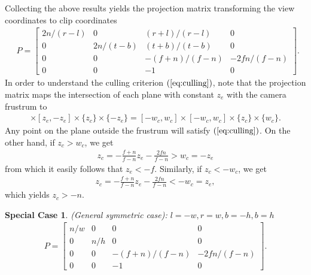 \documentclass [12pt, a4paper] {article}
\newtheorem {specialcase} {Special Case}
\begin{document}
Collecting the above results yields the projection matrix transforming the view 
coordinates to clip coordinates
\begin {eqnarray}
    \boxed {
        \quad
        P
        =
        \begin {bmatrix}
            2n/(r-l) & 0 & (r+l)/(r-l) & 0 \\
            0 & 2n/(t-b) & (t+b)/(t-b) & 0 \\
            0 & 0 & -(f+n)/(f-n) & -2fn/(f-n) \\
            0 & 0 & -1 & 0
        \end {bmatrix}.
        \quad
    }
\end {eqnarray}
In order to understand the culling criterion $(\ref{eq:culling})$, 
note that the projection matrix maps the intersection of each plane with constant $z_e$ 
with the camera frustrum to
\begin {eqnarray}
    [z_e, -z_e]\times [z_e, -z_e]\times\{z_c\}\times\{-z_e\}
    =
    [-w_c, w_c]\times [-w_c, w_c]\times\{z_c\}\times\{w_c\}.
\end {eqnarray}
Any point on the plane outside the frustrum will satisfy $(\ref{eq:culling})$.
On the other hand, if $z_c > w_c$, we get
\begin {eqnarray}
    z_c = -\frac{f + n}{f - n}z_e - \frac{2fn}{f - n} > w_c = - z_e 
\end {eqnarray}
from which it easily follows that $z_e < -f$. Similarly, if $z_c < - w_c$, we get
\begin {eqnarray}
    z_c = -\frac{f + n}{f - n}z_e - \frac{2fn}{f - n} < -w_c = z_e,
\end {eqnarray}
which yields $z_c > -n$.
\begin {specialcase}
(General symmetric case): $l=-w, r=w, b=-h, b=h$
\begin {eqnarray}
    \label{eq:proj_gensym}
    P
    =
    \begin {bmatrix}
        n/w & 0 & 0 & 0 \\
        0 & n/h & 0 & 0 \\
        0 & 0 & -(f+n)/(f-n) & -2fn/(f-n) \\
        0 & 0 & -1 & 0
    \end {bmatrix}.
\end {eqnarray}
\end {specialcase}
\end{document}
